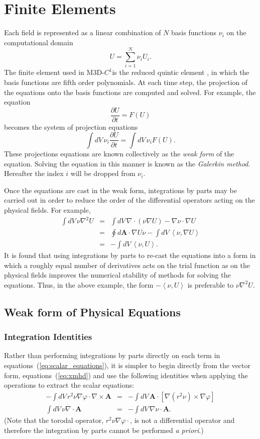 \documentclass[letterpaper]{book}
\newcommand{\ddt}[1]{\frac{\partial #1}{\partial t}}
\renewcommand{\vec}[1]{\ensuremath{\mathbf{#1}}}
\newcommand{\tor}{\varphi}              %
\newcommand{\codename}{M3D-$C^1$}
\newcommand{\grad}[1]{\nabla #1}
\renewcommand{\div}[1]{\nabla \cdot #1}
\newcommand{\curl}[1]{\nabla \times #1}
\newcommand{\ip}[2]{\left\langle  #1,#2\right\rangle}
\begin{document}
\section{Finite Elements}

Each field is represented as a linear combination of $N$ basis
functions $\nu_i$ on the computational domain
\[ U = \sum_{i=1}^N \nu_i U_i. \]
The finite element used in \codename is the reduced quintic element
\cite{Jardin04}, in which the basis functions are fifth order
polynomials.  At each time step, the projection of the equations onto
the basis functions are computed and solved.  For example, the
equation
\[ \ddt{U} = F(U) \]
becomes the system of projection equations
\[ \int dV\, \nu_i \ddt{U} = \int dV\, \nu_i F(U). \]
These projections equations are known collectively as the \emph{weak
form} of the equation.  Solving the equation in this manner is known
as the \emph{Galerkin method}.  Hereafter the index $i$ will be
dropped from $\nu_i$.

Once the equations are cast in the weak form, integrations by parts
may be carried out in order to reduce the order of the differential
operators acting on the physical fields.  For example, 
\begin{eqnarray*}
  \int dV\, \nu \nabla^2 U 
  & = & \int dV\, \div{(\nu \grad{U})} - \grad{\nu} \cdot \grad{U}\\
  & = & \oint d\vec{A} \cdot \grad{U} \nu - \int dV\, \ip{\nu}{\nabla U}\\
  & = & - \int dV\, \ip{\nu}{U}.
\end{eqnarray*}
It is found that using integrations by parts to re-cast the equations
into a form in which a roughly equal number of derivatives acts on the
trial function as on the physical fields improves the numerical
stability of methods for solving the equations.  Thus, in the above
example, the form $-\ip{\nu}{U}$ is preferable to $\nu \nabla^2
U$.

\subsection{Weak form of Physical Equations}

\subsubsection{Integration Identities}

Rather than performing integrations by parts directly on each term in
equations~(\ref{eq:scalar_equations}), it is simpler to begin directly
from the vector form, equations~(\ref{eq:xmhd}) and use the following
identities when applying the operations to extract the scalar
equations:
\begin{eqnarray*}
  -\int dV\, r^2 \nu \grad{\tor} \cdot \curl{\vec{A}} & = & 
  -\int dV\, \vec{A} \cdot \left[\grad{(r^2 \nu)} \times \grad{\tor}
    \right]
  \\
  \int dV\, \nu \div{\vec{A}} & = & 
  -\int dV\, \grad{\nu} \cdot \vec{A}.
\end{eqnarray*}
(Note that the torodal operator, $r^2 \nu \grad{\tor} \cdot$, is not a
differential operator and therefore the integration by parts cannot be
performed \emph{a priori}.)  
\end{document}
